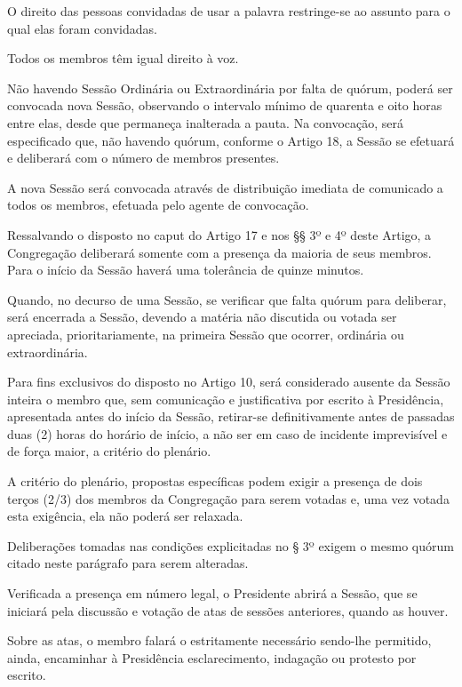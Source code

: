 \documentclass{documento}
\begin{document}
\paragrafo O direito das pessoas convidadas de usar a palavra restringe-se ao assunto para o qual elas foram convidadas.

\paragrafo Todos os membros têm igual direito à voz.

\artigo Não havendo Sessão Ordinária ou Extraordinária por falta de quórum, poderá ser convocada nova Sessão, observando o intervalo mínimo de quarenta e oito horas entre elas, desde que permaneça inalterada a pauta. Na convocação, será especificado que, não havendo quórum, conforme o Artigo 18, a Sessão se efetuará e deliberará com o número de membros presentes.

\paragrafounico A nova Sessão será convocada através de distribuição imediata de comunicado a todos os membros, efetuada pelo agente de convocação.

\artigo Ressalvando o disposto no caput do Artigo 17 e nos §§ 3º e 4º deste Artigo, a Congregação deliberará somente com a presença da maioria de seus membros. Para o início da Sessão haverá uma tolerância de quinze minutos.

\paragrafo Quando, no decurso de uma Sessão, se verificar que falta quórum para deliberar, será encerrada a Sessão, devendo a matéria não discutida ou votada ser apreciada, prioritariamente, na primeira Sessão que ocorrer, ordinária ou extraordinária.

\paragrafo Para fins exclusivos do disposto no Artigo 10, será considerado ausente da Sessão inteira o membro que, sem comunicação e justificativa por escrito à Presidência, apresentada antes do início da Sessão, retirar-se definitivamente antes de passadas duas (2) horas do horário de início, a não ser em caso de incidente imprevisível e de força maior, a critério do plenário.

\paragrafo A critério do plenário, propostas específicas podem exigir a presença de dois terços (2/3) dos membros da Congregação para serem votadas e, uma vez votada esta exigência, ela não poderá ser relaxada.

\paragrafo Deliberações tomadas nas condições explicitadas no § 3º exigem o mesmo quórum citado neste parágrafo para serem alteradas.

\artigo Verificada a presença em número legal, o Presidente abrirá a Sessão, que se iniciará pela discussão e votação de atas de sessões anteriores, quando as houver.

\paragrafounico Sobre as atas, o membro falará o estritamente necessário sendo-lhe permitido, ainda, encaminhar à Presidência esclarecimento, indagação ou protesto por escrito.
\end{document}
